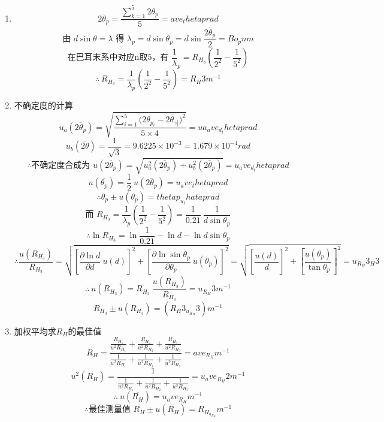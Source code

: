 \begin{enumerate}
  \item { }
      $$\overline{2{\theta}_p} = \displaystyle\frac{\sum_{k=1}^5 2{\theta}_p}{5} = {{ave_thetap}}rad$$
      $$\displaystyle\text{由\ }d\sin{\theta} = {\lambda}\text{\ 得\ }{\lambda}_p = d\sin{\theta}_p = d\sin{\frac{\overline{2{\theta}_p}}{2}} = {{Bo_p}}nm$$
      $$\displaystyle\text{在巴耳末系中对应n取5，有\ }\frac{1}{\lambda}_p = R_{H_3}\left(\frac{1}{2^2}-\frac{1}{5^2}\right)$$
      $$\therefore\ \displaystyle R_{H_3} = \frac{1}{ {\lambda}_p}\left(\frac{1}{2^2}-\frac{1}{5^2}\right) = {{R_H3}}m^{-1}$$
  \item {不确定度的计算}
      $$u_a(\overline{2{\theta}_p}) = \displaystyle\sqrt{\frac{\sum_{i=1}^5{(2{\theta}_{p_{i}}-\overline{2{\theta}_{\gamma]}}})^2}{5\times4}}={{ua_ave_d_thetap}} rad$$
      $$u_b(\overline{2\theta}) = \displaystyle\frac{1}{\sqrt3} = 9.6225\times10^{-3} = 1.679 \times 10^{-4} rad$$
      $$\therefore\text{不确定度合成为\ }u(\overline{2{\theta}_p}) = \sqrt{u_a^2(\overline{2{\theta}_p})+u_b^2(\overline{2{\theta}_p})} = {{u_ave_d_thetap}}rad$$
      $$u(\overline{ {\theta}_p})= \displaystyle\frac12\ u(\overline{2{\theta}_p}) = {{u_ave_thetap}}rad$$
      $$\therefore{\theta}_p \pm u({\theta}_p) = {{thetap_u_thatap}}rad$$
      $$\text{而\ }\displaystyle R_{H_3} = \frac{1}{ {\lambda}_p}\left(\frac{1}{2^2}-\frac{1}{5^2}\right) = \frac{1}{0.21}\ \frac{1}{d\sin{\theta}_p}$$
      $$\therefore\ln{R_{H_3}} = \ln{\frac{1}{0.21}} -\ln{d} - \ln{d\sin{\theta}_p}$$
      $$\therefore\displaystyle \frac{u(R_{H_3})}{R_{H_3}} = \sqrt{ {\left[\frac{\partial{\ln{d}}}{\partial{d}}\ u(d)\right]}^2 + {\left[\frac{\partial{\ln{\sin{ {\theta}_p}}}}{\partial{ {\theta}_p}}\ u({\theta}_p)\right]}^2} = \sqrt{ {\left[\frac{u(d)}{d}\right]}^2 + {\left[\frac{u({\theta}_p)}{\tan{ {\theta}_p}}\right]}^2} = {{u_R_H3_H3}}$$
      $$\therefore \ u(R_{H_3}) = \displaystyle R_{H_3}\ \frac{u(R_{H_3})}{R_{H_3}} = {{u_R_H3}}m^{-1}$$ 
      $$R_{H_3} \pm u(R_{H_3}) = ({{R_H3_u_R_H3}})m^{-1}$$
  \item{加权平均求$R_H$的最佳值}
      $$\overline{R_H} = \displaystyle\frac{\frac{R_{H_1}}{u^2{R_{H_1}}}+\frac{R_{H_2}}{u^2{R_{H_2}}}+\frac{R_{H_3}}{u^2{R_{H_3}}}}{\frac{1}{u^2{R_{H_1}}}+\frac{1}{u^2{R_{H_2}}}+\frac{1}{u^2{R_{H_3}}}} = {{ave_R_H}}m^{-1}$$
      $$u^2(\overline{R_H}) = \displaystyle\frac{1}{\frac{1}{u^2{R_{H_1}}}+\frac{1}{u^2{R_{H_2}}}+\frac{1}{u^2{R_{H_3}}}} = {{u_ave_R_H2}}m^{-1}$$
      $$\therefore \ u(\overline{R_H}) = {{u_ave_R_H}}m^{-1} $$
      $$\therefore\text{最佳测量值 \ } \overline{R_H} \pm u(\overline{R_H}) = {{R_H_u_R_H}} m^{-1}$$   
\end{enumerate}

